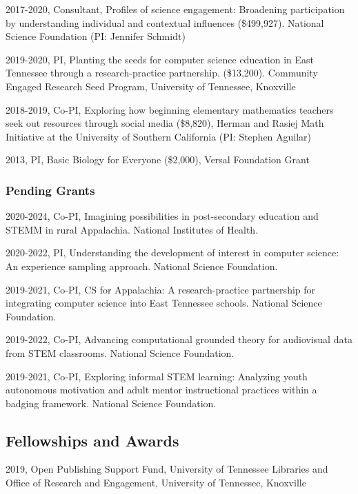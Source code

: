 \documentclass[14,]{article}
\begin{document}
2017-2020, Consultant, Profiles of science engagement: Broadening
participation by understanding individual and contextual influences
(\$499,927). National Science Foundation (PI: Jennifer Schmidt)

2019-2020, PI, Planting the seeds for computer science education in East
Tennessee through a research-practice partnership. (\$13,200). Community
Engaged Research Seed Program, University of Tennessee, Knoxville

2018-2019, Co-PI, Exploring how beginning elementary mathematics
teachers seek out resources through social media (\$8,820), Herman and
Rasiej Math Initiative at the University of Southern California (PI:
Stephen Aguilar)

2013, PI, Basic Biology for Everyone (\$2,000), Versal Foundation Grant

\hypertarget{pending-grants}{%
\subsubsection{Pending Grants}\label{pending-grants}}

2020-2024, Co-PI, Imagining possibilities in post-secondary education
and STEMM in rural Appalachia. National Institutes of Health.

2020-2022, PI, Understanding the development of interest in computer
science: An experience sampling approach. National Science Foundation.

2019-2021, Co-PI, CS for Appalachia: A research-practice partnership for
integrating computer science into East Tennessee schools. National
Science Foundation.

2019-2022, Co-PI, Advancing computational grounded theory for
audiovisual data from STEM classrooms. National Science Foundation.

2019-2021, Co-PI, Exploring informal STEM learning: Analyzing youth
autonomous motivation and adult mentor instructional practices within a
badging framework. National Science Foundation.

\hypertarget{fellowships-and-awards}{%
\subsection{Fellowships and Awards}\label{fellowships-and-awards}}

2019, Open Publishing Support Fund, University of Tennessee Libraries
and Office of Research and Engagement, University of Tennessee,
Knoxville
\end{document}
